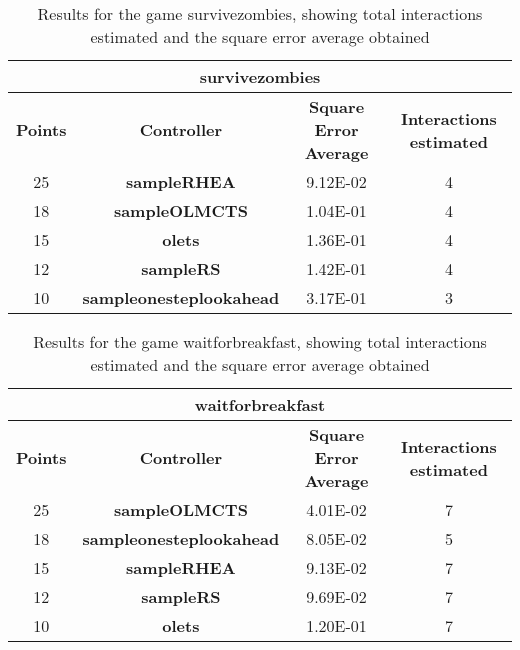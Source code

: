 \begin{table*}[!t]
\begin{center}
\begin{adjustbox}{width=1\textwidth}
\begin{tabular}{|c|c|c|c|}
\hline
\multicolumn{4}{|c|}{\textbf{survivezombies}}\\
\hline
\textbf{Points} & \textbf{Controller} & \textbf{Square Error Average} & \textbf{Interactions estimated}\\
\hline
25 & \textbf{sampleRHEA} & 9.12E-02 & 4
 \\
\hline
18 & \textbf{sampleOLMCTS} & 1.04E-01 & 4
 \\
\hline
15 & \textbf{olets} & 1.36E-01 & 4
 \\
\hline
12 & \textbf{sampleRS} & 1.42E-01 & 4
 \\
\hline
10 & \textbf{sampleonesteplookahead} & 3.17E-01 & 3
 \\
\hline
\end{tabular}
\end{adjustbox}
\caption{Results for the game survivezombies, showing total interactions estimated and the square error average obtained}
\label{tab:weights}
\end{center}
\end{table*}
\begin{table*}[!t]
\begin{center}
\begin{adjustbox}{width=1\textwidth}
\begin{tabular}{|c|c|c|c|}
\hline
\multicolumn{4}{|c|}{\textbf{waitforbreakfast}}\\
\hline
\textbf{Points} & \textbf{Controller} & \textbf{Square Error Average} & \textbf{Interactions estimated}\\
\hline
25 & \textbf{sampleOLMCTS} & 4.01E-02 & 7
 \\
\hline
18 & \textbf{sampleonesteplookahead} & 8.05E-02 & 5
 \\
\hline
15 & \textbf{sampleRHEA} & 9.13E-02 & 7
 \\
\hline
12 & \textbf{sampleRS} & 9.69E-02 & 7
 \\
\hline
10 & \textbf{olets} & 1.20E-01 & 7
 \\
\hline
\end{tabular}
\end{adjustbox}
\caption{Results for the game waitforbreakfast, showing total interactions estimated and the square error average obtained}
\label{tab:weights}
\end{center}
\end{table*}
